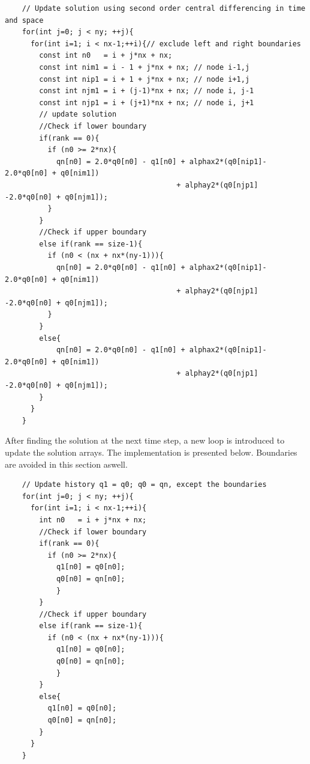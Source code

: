 \documentclass[12pt]{article}
\begin{document}
\begin{verbatim}
    // Update solution using second order central differencing in time and space
    for(int j=0; j < ny; ++j){
      for(int i=1; i < nx-1;++i){// exclude left and right boundaries
        const int n0   = i + j*nx + nx; 
        const int nim1 = i - 1 + j*nx + nx; // node i-1,j
        const int nip1 = i + 1 + j*nx + nx; // node i+1,j
        const int njm1 = i + (j-1)*nx + nx; // node i, j-1
        const int njp1 = i + (j+1)*nx + nx; // node i, j+1
        // update solution
        //Check if lower boundary
        if(rank == 0){
          if (n0 >= 2*nx){
            qn[n0] = 2.0*q0[n0] - q1[n0] + alphax2*(q0[nip1]- 2.0*q0[n0] + q0[nim1])
                                        + alphay2*(q0[njp1] -2.0*q0[n0] + q0[njm1]); 
          }
        }
        //Check if upper boundary
        else if(rank == size-1){
          if (n0 < (nx + nx*(ny-1))){
            qn[n0] = 2.0*q0[n0] - q1[n0] + alphax2*(q0[nip1]- 2.0*q0[n0] + q0[nim1])
                                        + alphay2*(q0[njp1] -2.0*q0[n0] + q0[njm1]); 
          }
        }
        else{ 
            qn[n0] = 2.0*q0[n0] - q1[n0] + alphax2*(q0[nip1]- 2.0*q0[n0] + q0[nim1])
                                        + alphay2*(q0[njp1] -2.0*q0[n0] + q0[njm1]);
        } 
      }
    }
    \end{verbatim}
After finding the solution at the next time step, a new loop is introduced to update the solution arrays. The implementation is presented below. Boundaries are avoided in this section aswell.
\begin{verbatim}
    // Update history q1 = q0; q0 = qn, except the boundaries
    for(int j=0; j < ny; ++j){ 
      for(int i=1; i < nx-1;++i){
        int n0   = i + j*nx + nx;
        //Check if lower boundary
        if(rank == 0){
          if (n0 >= 2*nx){
            q1[n0] = q0[n0]; 
            q0[n0] = qn[n0];
            }
        }
        //Check if upper boundary
        else if(rank == size-1){
          if (n0 < (nx + nx*(ny-1))){
            q1[n0] = q0[n0]; 
            q0[n0] = qn[n0];
            }
        }
        else{  
          q1[n0] = q0[n0]; 
          q0[n0] = qn[n0];
        }
      }
    } 
    \end{verbatim}
\end{document}
